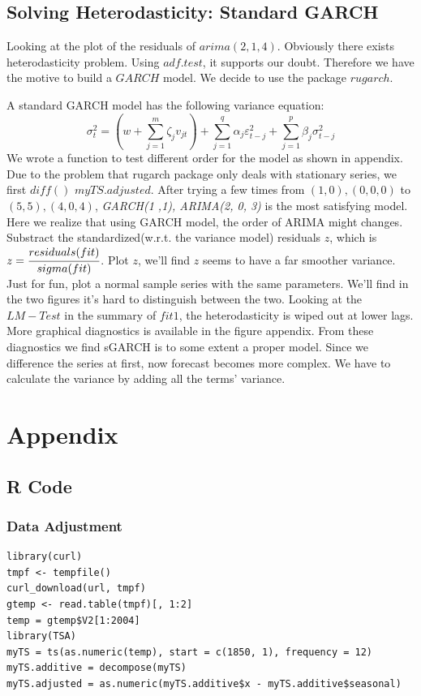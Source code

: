 \documentclass[a4paper,10pt]{article}
\begin{document}
\subsection{Solving Heterodasticity: Standard GARCH}
Looking at the plot of the residuals of $arima(2, 1, 4)$. Obviously there exists heterodasticity problem. Using $adf.test$, it supports our doubt. Therefore we have the motive to build a $GARCH$ model. We decide to use the package $rugarch$.\par
A standard GARCH model has the following variance equation:
\begin{equation*}
	\sigma_t^2 = (w + \sum_{j = 1}^m \zeta_j v_{jt}) + \sum_{j = 1}^q \alpha_j \varepsilon_{t-j}^2 + \sum_{j = 1}^p \beta_j \sigma_{t-j}^2
\end{equation*} 
\indent We wrote a function to test different order for the model as shown in appendix. Due to the problem that rugarch package only deals with stationary series, we first $diff()$ $myTS.adjusted$. After trying a few times from $(1, 0), (0, 0, 0)$ to $(5, 5), (4, 0, 4)$, \textit{GARCH(1 ,1), ARIMA(2, 0, 3)} is the most satisfying model. Here we realize that using GARCH model, the order of ARIMA might changes. 
\indent Substract the standardized(w.r.t. the variance model) residuals $z$, which is $z = \cfrac{residuals(fit)}{sigma(fit)}$. Plot $z$, we'll find $z$ seems to have a far smoother variance. Just for fun, plot a normal sample series with the same parameters. We'll find in the two figures it's hard to distinguish between the two. Looking at the $LM-Test$ in the summary of $fit 1$, the heterodasticity is wiped out at lower lags.  More graphical diagnostics is available in the figure appendix. From these diagnostics we find sGARCH is to some extent a proper model.
\indent Since we difference the series at first, now forecast becomes more complex. We have to calculate the variance by adding all the terms' variance.




\newpage
\section{Appendix}

\subsection{R Code}
\subsubsection{Data Adjustment}
\begin{verbatim}
library(curl)
tmpf <- tempfile()
curl_download(url, tmpf)
gtemp <- read.table(tmpf)[, 1:2]
temp = gtemp$V2[1:2004]
library(TSA)
myTS = ts(as.numeric(temp), start = c(1850, 1), frequency = 12)
myTS.additive = decompose(myTS)
myTS.adjusted = as.numeric(myTS.additive$x - myTS.additive$seasonal)
\end{verbatim}
\end{document}
